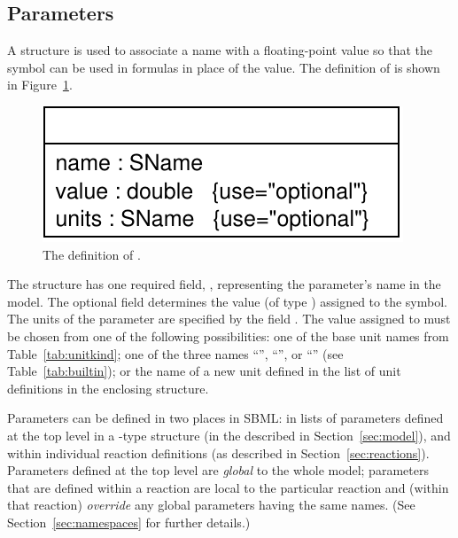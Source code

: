 \documentclass[10pt]{cekarticle}
\newcommand{\vref}[1]{\ref{#1}}
\newcommand{\changed}[1]{\textcolor{BrickRed}{#1}}
\begin{document}
\subsection{Parameters}
\label{sec:parameters}

A  structure is used to associate a \changed{name} with a
floating-point value so that the symbol can be used in formulas in place of
the value.  The definition of  is shown in
Figure~\vref{fig:parameter}.

\begin{figure}[htb]
  \centering
  \vspace*{5pt}
  \includegraphics[scale = 0.65]{parameter}
  \caption{The definition of .}
  \label{fig:parameter}
\end{figure}

\changed{The  structure has one required field,
  \attrib{name}, representing the parameter's name in the model.}  The
\changed{optional} field  determines the value (of type
) assigned to the symbol.  The units of the parameter
 are specified by the field .  The value
assigned to  must be chosen from one of the following
possibilities: one of \changed{the} base unit names from
Table~\vref{tab:unitkind}; one of the three names
``'', ``'', or ``''
(see Table~\ref{tab:builtin}); or the name of a new unit defined in the
list of unit definitions in the enclosing  structure.

Parameters \changed{can be defined} in two places in SBML: in lists of
parameters defined at the top level in a -type structure
\changed{(in the  described in
  Section~\ref{sec:model})}, and within individual reaction definitions
\changed{(as described in Section~\ref{sec:reactions})}.  Parameters
defined at the top level are \emph{global} to the whole model; parameters
that are defined within a reaction are local to the particular reaction and
(within that reaction) \emph{override} any global parameters having the
same names.  (See Section~\ref{sec:namespaces} for further details.)
\end{document}
